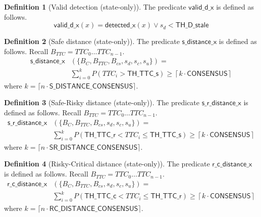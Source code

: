 \documentclass[12pt]{article}
\theoremstyle{definition}
\newtheorem{definition}{Definition}[section]
\begin{document}
\begin{definition}[Valid detection (state-only)]
    The predicate $\mathsf{valid\_d\_x}$ is defined as follows.
    \[
        \mathsf{valid\_d\_x}(x) = \mathsf{detected\_x}(x) \lor s_d < \mathsf{TH\_D\_stale}
    \]
\end{definition}

\begin{definition}[Safe distance (state-only)]
The predicate $\mathsf{s\_distance\_x}$ is defined as follows. Recall $B_{TTC} = TTC_0 \ldots TTC_{n-1}$.
\[
    \begin{aligned}
            \mathsf{s\_distance\_x}&(\{B_C, B_{TTC}, B_{cs}, s_d, s_c, s_u\}) = \\
            &\sum_{i=0}^{k} P(TTC_i > \mathsf{TH\_TTC\_s}) \geq 
            \left\lceil k \cdot \mathsf{ CONSENSUS}\right\rceil
    \end{aligned}
\]
where $k = \lceil n \cdot \mathsf{S\_DISTANCE\_CONSENSUS} \rceil$.
\end{definition}

\begin{definition}[Safe-Risky distance (state-only)]
The predicate $\mathsf{s\_r\_distance\_x}$ is defined as follows. Recall $B_{TTC} = TTC_0 \ldots TTC_{n-1}$.
\[
    \begin{aligned}
        \mathsf{s\_r\_distance\_x}&(\{B_C, B_{TTC}, B_{cs}, s_d, s_c, s_u\}) = \\
        &\sum_{i=0}^{k} P(\mathsf{TH\_TTC\_r} < TTC_i \leq \mathsf{TH\_TTC\_s}) \geq 
        \left\lceil k \cdot \mathsf{CONSENSUS}\right\rceil
    \end{aligned}
\]
where $k = \lceil n \cdot \mathsf{SR\_DISTANCE\_CONSENSUS} \rceil$.
\end{definition}

\begin{definition}[Risky-Critical distance (state-only)]
The predicate $\mathsf{r\_c\_distance\_x}$ is defined as follows. Recall $B_{TTC} = TTC_0 \ldots TTC_{n-1}$.
\[
    \begin{aligned}
        \mathsf{r\_c\_distance\_x}&(\{B_C, B_{TTC}, B_{cs}, s_d, s_c, s_u\}) = \\ 
        &\sum_{i=0}^{k} P(\mathsf{TH\_TTC\_c} < TTC_i \leq \mathsf{TH\_TTC\_r}) \geq 
        \left\lceil k \cdot \mathsf{CONSENSUS}\right\rceil
    \end{aligned}
\]
where $k = \lceil n \cdot \mathsf{RC\_DISTANCE\_CONSENSUS} \rceil$.    
\end{definition}
\end{document}
